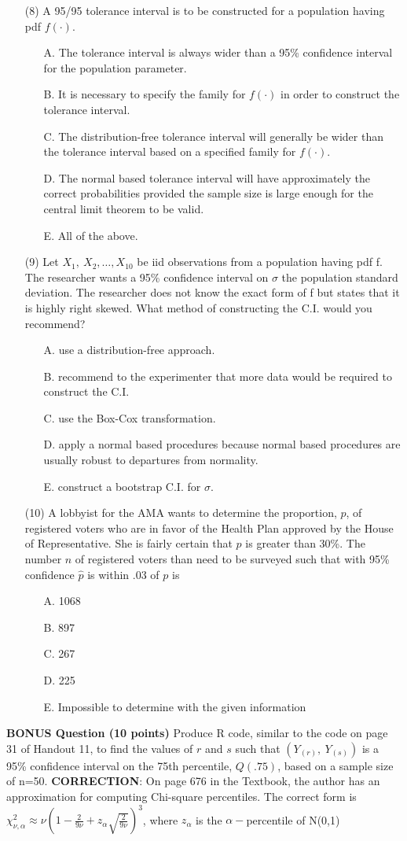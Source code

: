 \documentclass{article}\usepackage{graphicx, color}
\def\be{\begin{enumerate}}
\def\ee{\end{enumerate}}
\def\vvn{\vskip0mm\noindent}
\begin{document}
\begin{enumerate}
\item[(8)]  A 95/95 tolerance interval is  to
 be constructed for a population having
 pdf  $f(\cdot)$.
\be
\item[A.] The tolerance interval is always wider than a 95\%
  confidence interval for the population parameter.
\item[B.] It is necessary to specify the family for $f(\cdot)$ in
  order to construct the tolerance interval.
\item[C.] The distribution-free tolerance interval will generally be
  wider than the tolerance interval based on  a specified family for
  $f(\cdot)$.
\item[D.] The normal based tolerance interval will have approximately
  the correct probabilities provided the sample size is large enough
  for the central limit theorem to be valid.
\item[E.] All of the above.
\ee
\vfill\newpage
\item[(9)] Let $X_1,\ X_2,\ldots,X_{10}$ be iid observations from a population
having pdf f. The researcher wants a 95\% confidence interval on $\sigma$
the population standard deviation. The researcher does not know the exact form of f
but states that it is highly right skewed. What method of constructing the C.I. would
you recommend?
\be
\item[A.] use a distribution-free approach.
\item[B.] recommend to the experimenter that more data would be required to construct the C.I.
\item[C.] use the Box-Cox transformation.
\item[D.] apply a normal based procedures because normal based procedures are usually
  robust to departures from normality.
\item[E.] construct a bootstrap C.I. for $\sigma$.
\ee
\item[(10)] A lobbyist for the AMA wants to determine the proportion, $p$, of registered voters who are in favor
of the Health Plan approved by the House of Representative. She is fairly certain that $p$ is greater than 30\%.
The number $n$ of registered voters than need to be surveyed such that with 95\% confidence $\widehat{p}$ is within .03 of $p$ is
\be
\item[A.] 1068
\item[B.] 897
\item[C.] 267
\item[D.] 225
\item[E.] Impossible to determine with the given information
\ee\ee
\vskip20mm\vvn
{\bf BONUS Question (10 points)} Produce R code, similar to the code on page 31 of Handout 11, to find the values of $r$ and $s$ such 
that $(Y_{(r)},\ Y_{(s)})$ is a 95\% confidence interval on the 75th percentile, $Q(.75)$, based on a sample size of n=50.
\vskip20mm
\vvn\vvn\vvn
{\bf CORRECTION}: On page 676 in the Textbook, the author has an approximation for computing
Chi-square percentiles. The correct form is
\vskip2mm
$\chi^2_{\nu,\alpha} \approx \nu \left (1-\frac{2}{9\nu}+z_{\alpha}\sqrt{\frac{2}{9\nu}}\right )^3$, where $z_{\alpha}$ is the $\alpha-$percentile of N(0,1)


\vfill
\end{document}
